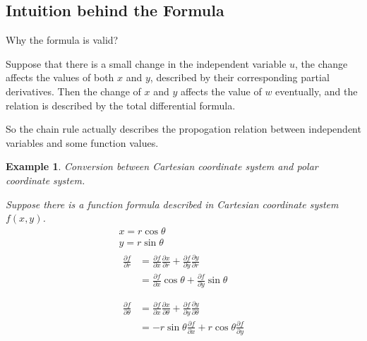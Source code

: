\documentclass{article}
\newtheorem{example}{Example}
\begin{document}
\subsection{Intuition behind the Formula}

Why the formula is valid?

Suppose that there is a small change in the independent variable $u$, the change 
affects the values of both $x$ and $y$, described by their corresponding partial 
derivatives. Then the change of $x$ and $y$ affects the value of $w$ eventually, 
and the relation is described by the total differential formula.

So the chain rule actually describes the propogation relation between 
independent variables and some function values.

\begin{example}
  Conversion between Cartesian coordinate system and polar coordinate system.

  Suppose there is a function formula described in Cartesian coordinate system 
  $f(x, y)$.
  \begin{gather*}
    x = r \cos\theta \\
    y = r \sin\theta \\
    \begin{split}
      \frac{\partial f}{\partial r} &= \frac{\partial f}{\partial x}\frac{\partial x}{\partial r} + \frac{\partial f}{\partial y}\frac{\partial y}{\partial r} \\
                                    &= \frac{\partial f}{\partial x} \cos\theta + \frac{\partial f}{\partial y} \sin\theta \\
    \end{split} \\
    \begin{split}
      \frac{\partial f}{\partial \theta} &= \frac{\partial f}{\partial x}\frac{\partial x}{\partial \theta} + \frac{\partial f}{\partial y}\frac{\partial y}{\partial \theta} \\
                                         &= -r \sin\theta \frac{\partial f}{\partial x} + r \cos\theta \frac{\partial f}{\partial y} \\
    \end{split} \\
  \end{gather*}
\end{example}
\end{document}
